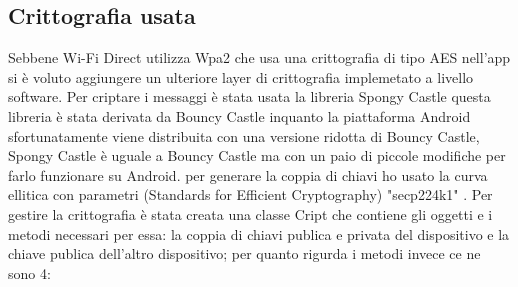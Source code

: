 \subsection{Crittografia usata}
Sebbene Wi-Fi Direct utilizza Wpa2 che usa una crittografia di tipo AES 
nell'app si è voluto aggiungere un ulteriore layer di crittografia implemetato a livello
software.
Per criptare i messaggi è stata usata la libreria 
Spongy Castle \cite{Spongy} questa libreria è stata derivata
da Bouncy Castle inquanto  
la piattaforma Android sfortunatamente viene 
distribuita con una versione ridotta di Bouncy Castle, 
Spongy Castle è uguale a Bouncy Castle 
ma con un paio di piccole modifiche per farlo funzionare su Android.
per generare la coppia di chiavi ho usato la curva ellitica con parametri 
(Standards for Efficient Cryptography)
"secp224k1" \cite{sec}.
Per gestire la crittografia è stata creata una classe Cript che contiene
gli oggetti e i metodi necessari per essa: la coppia di chiavi publica e privata 
del dispositivo e la chiave publica dell'altro dispositivo; per quanto rigurda i metodi
invece ce ne sono 4: 
